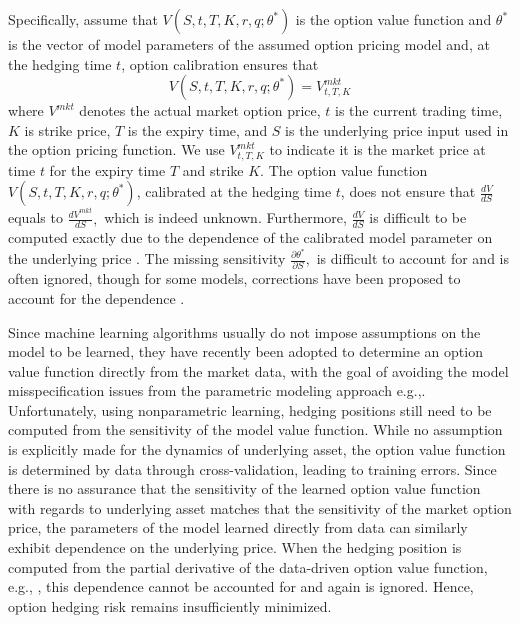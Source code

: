 \documentclass[letterpaper,12pt,titlepage,oneside,final]{book}
\numberwithin{equation}{section}
\theoremstyle{definition}
\newcommand{\Vmkt}{V^{mkt}}
\begin{document}
Specifically, assume that $V(S,t,T,K,r,q;\theta^*)$ is  the option value function and $\theta^*$ is the vector of model parameters of the assumed option pricing model and, at the hedging time $t$,
option calibration ensures that
\begin{equation} \label{eq:imp}
V(S,t,T,K,r,q; \theta^*)=V^{mkt}_{t,T,K}
\end{equation}
where $\Vmkt$ denotes the actual market option price,  $t$ is the current trading time,  $K$  is  strike price,  $T$ is the expiry time, and $S$ is the underlying price input used in the option pricing function. We use $V^{mkt}_{t,T,K}$ to indicate it is the market price at time $t$ for  the expiry time $T$ and strike $K$.
The option value function $V(S,t,T,K,r,q; \theta^*)$, calibrated at the hedging time $t$,  does not ensure that
 $
\frac{d V}{d S}
$
equals to
$
\frac{d \Vmkt}{d S},
$
which is indeed unknown.
Furthermore, $
\frac{d V}{d S}
$ is difficult to be computed exactly due to the dependence of the calibrated model parameter on the underlying price \citep{knian2017,coleman2001,hulloptimal}. The missing sensitivity $
\frac{\partial \theta^*}{\partial S},
$ is difficult to account for and is often ignored, though
for some models, corrections have been proposed to account for the dependence \citep{hulloptimal,hagan2017bartlett,bartlett2006hedging}.


Since machine learning algorithms usually do not impose assumptions on the model to be learned, they have recently been adopted to determine an option value function directly from the market data, with the goal of avoiding the model misspecification issues from the parametric modeling approach e.g.,\citep{gradojevic2009option,garcia2000pricing,hutchinson}.
Unfortunately, using nonparametric learning, hedging positions still need to be computed from the sensitivity of the model value function.
While no assumption is explicitly made for the  dynamics of underlying asset, the option value function is determined by data through cross-validation, leading to training errors.
Since there is no assurance that the  sensitivity of the learned option value function  with regards to underlying asset matches that the sensitivity of the market option price,
the parameters of the model learned directly from data can similarly exhibit dependence on the underlying price. When the hedging position is computed from the partial derivative of the data-driven option value function, e.g.,  \citep{hutchinson}, this dependence cannot be accounted for and again is ignored. Hence, option hedging risk remains insufficiently minimized.
\end{document}
